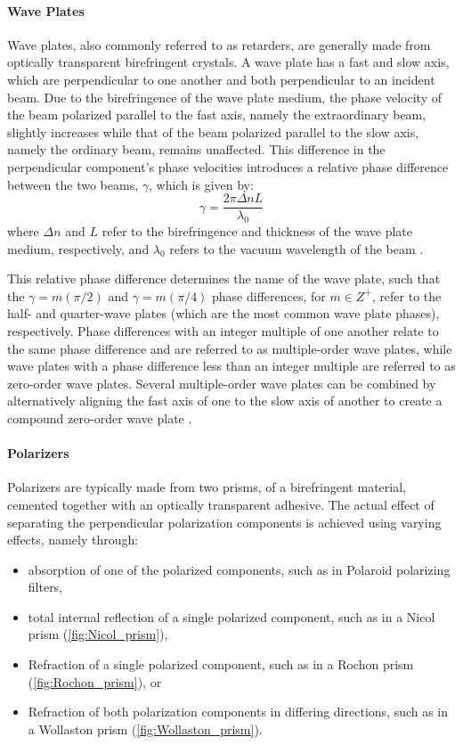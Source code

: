 \paragraph{Wave Plates}
Wave plates, also commonly referred to as retarders, are generally made from optically transparent birefringent crystals.
A wave plate has a fast and slow axis, which are perpendicular to one another and both perpendicular to an incident beam.
Due to the birefringence of the wave plate medium, the phase velocity of the beam polarized parallel to the fast axis, namely the extraordinary beam, slightly increases while that of the beam polarized parallel to the slow axis, namely the ordinary beam, remains unaffected.
This difference in the perpendicular component's phase velocities introduces a relative phase difference between the two beams, $\gamma$, which is given by:
\begin{equation}
    \gamma = \frac{2 \pi \Delta n L}{\lambda_{0}}
\end{equation}
where $\Delta n$ and $L$ refer to the birefringence and thickness of the wave plate medium, respectively, and $\lambda_{0}$ refers to the vacuum wavelength of the beam \citep{Hecht_optics}.

This relative phase difference determines the name of the wave plate, such that the $\gamma = m(\pi/2) $ and $\gamma = m(\pi/4)$ phase differences, for $m \in Z^{+}$, refer to the half- and quarter-wave plates (which are the most common wave plate phases), respectively.
Phase differences with an integer multiple of one another relate to the same phase difference and are referred to as multiple-order wave plates, while wave plates with a phase difference less than an integer multiple are referred to as zero-order wave plates.
Several multiple-order wave plates can be combined by alternatively aligning the fast axis of one to the slow axis of another to create a compound zero-order wave plate \citep{Hale_birefringence}.

\paragraph{Polarizers} \label{par:polarizer}
Polarizers are typically made from two prisms, of a birefringent material, cemented together with an optically transparent adhesive.
The actual effect of separating the perpendicular polarization components is achieved using varying effects, namely through:
\begin{itemize}
    \item absorption of one of the polarized components, such as in Polaroid polarizing filters,
    \item total internal reflection of a single polarized component, such as in a Nicol prism (\autoref{fig:Nicol_prism}),
    \item Refraction of a single polarized component, such as in a Rochon prism (\autoref{fig:Rochon_prism}), or
    \item Refraction of both polarization components in differing directions, such as in a Wollaston prism (\autoref{fig:Wollaston_prism}).
\end{itemize}

